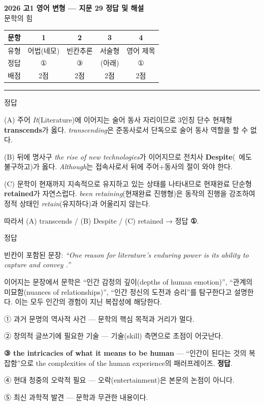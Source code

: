 \documentclass[11pt,a4paper]{article}
\newcommand{\sol}[2]{\vspace{6pt}{\sffamily\bfseries #1} \quad 정답 \fbox{#2}\par\vspace{1pt}}
\begin{document}
\begin{center}
{\fontsize{15}{17}\selectfont\sffamily\bfseries 2026 고1 영어 변형 — 지문 29 정답 및 해설}\\[2pt]
{\sffamily 문학의 힘}
\end{center}
\vspace{6pt}

\begin{center}
\renewcommand{\arraystretch}{1.4}
\begin{tabular}{|c|c|c|c|c|}
\hline
\sffamily 문항 & 1 & 2 & 3 & 4 \\\hline
\sffamily 유형 & \sffamily 어법(네모) & \sffamily 빈칸추론 & \sffamily 서술형 & \sffamily 영어 제목 \\\hline
\sffamily 정답 & ① & ③ & (아래) & ① \\\hline
\sffamily 배점 & 2점 & 2점 & 2점 & 2점 \\\hline
\end{tabular}
\end{center}
\vspace{8pt}\hrule\vspace{4pt}

\sol{1. 어법(네모)}{①}
(A) 주어 \textit{It}(Literature)에 이어지는 술어 동사 자리이므로 3인칭 단수 현재형 \textbf{transcends}가 옳다. \textit{transcending}은 준동사로서 단독으로 술어 동사 역할을 할 수 없다.\par
(B) 뒤에 명사구 \textit{the rise of new technologies}가 이어지므로 전치사 \textbf{Despite}(~에도 불구하고)가 옳다. \textit{Although}는 접속사로서 뒤에 주어+동사의 절이 와야 한다.\par
(C) 문학이 현재까지 지속적으로 유지하고 있는 상태를 나타내므로 현재완료 단순형 \textbf{retained}가 자연스럽다. \textit{been retaining}(현재완료 진행형)은 동작의 진행을 강조하여 정적 상태인 \textit{retain}(유지하다)과 어울리지 않는다.\par
따라서 (A) transcends / (B) Despite / (C) retained → 정답 \textbf{①}.

\vspace{4pt}
\sol{2. 빈칸추론}{③}
빈칸이 포함된 문장: \textit{``One reason for literature's enduring power is its ability to capture and convey \underline{\hspace{4cm}}.''}\par
이어지는 문장에서 문학은 ``인간 감정의 깊이(depths of human emotion)'', ``관계의 미묘함(nuances of relationships)'', ``인간 정신의 도전과 승리''를 탐구한다고 설명한다. 이는 모두 인간의 경험이 지닌 복잡성에 해당한다.\par
① 과거 문명의 역사적 사건 — 문학의 핵심 목적과 거리가 멀다.\par
② 창의적 글쓰기에 필요한 기술 — 기술(skill) 측면으로 초점이 어긋난다.\par
\textbf{③ the intricacies of what it means to be human} — ``인간이 된다는 것의 복잡함''으로 the complexities of the human experience의 패러프레이즈. \textbf{정답}.\par
④ 현대 청중의 오락적 필요 — 오락(entertainment)은 본문의 논점이 아니다.\par
⑤ 최신 과학적 발견 — 문학과 무관한 내용이다.
\end{document}
